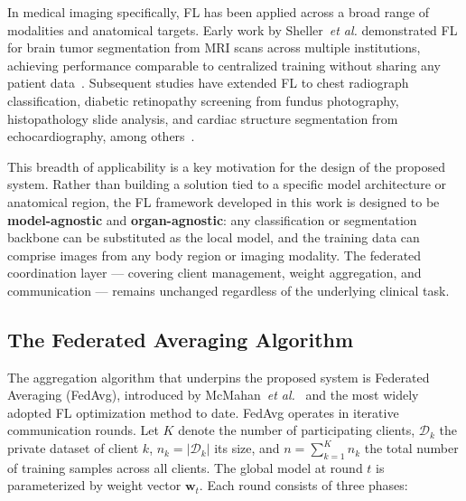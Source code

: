 In medical imaging specifically, FL has been applied across a broad range of
modalities and anatomical targets. Early work by Sheller~\textit{et al.}
demonstrated FL for brain tumor segmentation from MRI scans across multiple
institutions, achieving performance comparable to centralized training without
sharing any patient data~\cite{sheller2019}. Subsequent studies have extended
FL to chest radiograph classification, diabetic retinopathy screening from
fundus photography, histopathology slide analysis, and cardiac structure
segmentation from echocardiography, among others~\cite{rieke2020}.
 
This breadth of applicability is a key motivation for the design of the
proposed system. Rather than building a solution tied to a specific model
architecture or anatomical region, the FL framework developed in this work
is designed to be \textbf{model-agnostic} and \textbf{organ-agnostic}: any
classification or segmentation backbone can be substituted as the local
model, and the training data can comprise images from any body region or
imaging modality. The federated coordination layer — covering client
management, weight aggregation, and communication — remains unchanged
regardless of the underlying clinical task.
 
\subsection{The Federated Averaging Algorithm}
\label{subsec:fedavg}
 
The aggregation algorithm that underpins the proposed system is Federated
Averaging (FedAvg), introduced by McMahan~\textit{et al.}~\cite{mcmahan2017}
and the most widely adopted FL optimization method to date. FedAvg operates
in iterative communication rounds. Let $K$ denote the number of participating
clients, $\mathcal{D}_k$ the private dataset of client $k$, $n_k =
|\mathcal{D}_k|$ its size, and $n = \sum_{k=1}^{K} n_k$ the total number of
training samples across all clients. The global model at round $t$ is
parameterized by weight vector $\mathbf{w}_t$. Each round consists of three
phases:
 
